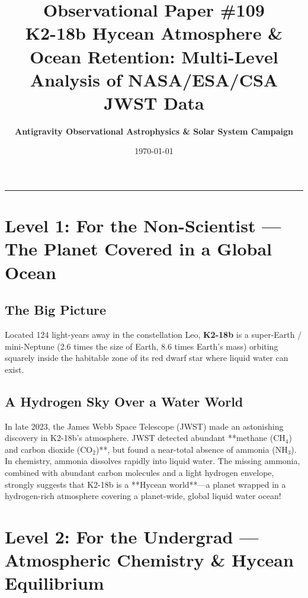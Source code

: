 \documentclass[11pt,a4paper]{article}
\title{\Huge \textbf{Observational Paper \#109}\\ \Large K2-18b Hycean Atmosphere \& Ocean Retention: Multi-Level Analysis of NASA/ESA/CSA JWST Data}
\author{\textbf{Antigravity Observational Astrophysics \& Solar System Campaign}}
\date{\today}
\begin{document}
\maketitle

\vspace{-1em}
\begin{center}
\rule{\textwidth}{1.5pt}
\end{center}

\section*{Level 1: For the Non-Scientist — The Planet Covered in a Global Ocean}

\subsection*{The Big Picture}
Located 124 light-years away in the constellation Leo, \textbf{K2-18b} is a super-Earth / mini-Neptune (2.6 times the size of Earth, 8.6 times Earth's mass) orbiting squarely inside the habitable zone of its red dwarf star where liquid water can exist.

\subsection*{A Hydrogen Sky Over a Water World}
In late 2023, the James Webb Space Telescope (JWST) made an astonishing discovery in K2-18b's atmosphere. JWST detected abundant **methane ($\mathrm{CH}_4$) and carbon dioxide ($\mathrm{CO}_2$)**, but found a near-total absence of ammonia ($\mathrm{NH}_3$). In chemistry, ammonia dissolves rapidly into liquid water. The missing ammonia, combined with abundant carbon molecules and a light hydrogen envelope, strongly suggests that K2-18b is a **Hycean world**—a planet wrapped in a hydrogen-rich atmosphere covering a planet-wide, global liquid water ocean!

\newpage

\section*{Level 2: For the Undergrad — Atmospheric Chemistry \& Hycean Equilibrium}
\end{document}
